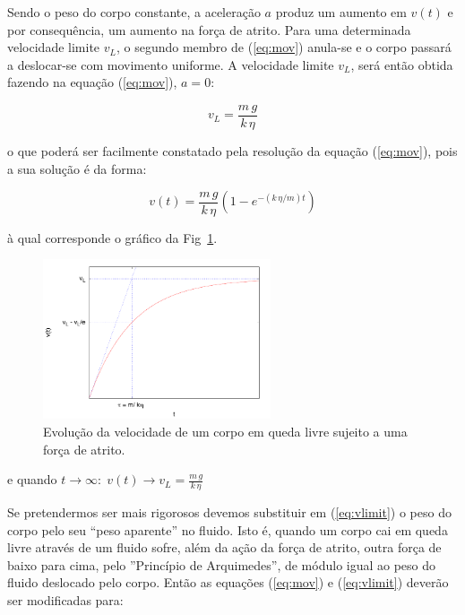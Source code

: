 \documentclass[a4paper,twoside,12pt]{article}      %
\begin{document}
Sendo o peso do corpo constante, a aceleração $a$ produz um aumento  em $v(t)$ e por consequência, um aumento na força de atrito. Para uma determinada velocidade limite $v_L$, o segundo membro de (\ref{eq:mov}) anula-se e o corpo passará a deslocar-se com movimento uniforme. A velocidade limite $v_L$, será então obtida fazendo na equação (\ref{eq:mov}), $a= 0$:

\begin{equation}
	\label{eq:vlimit}
	v_L = \frac{m\,g}{k  \, \eta}
\end{equation}

o que poderá ser facilmente constatado pela resolução da equação (\ref{eq:mov}), pois a sua solução é da forma:

\begin{equation}
	\label{eq:vlimita}
	v(t) = \frac{m\,g}{k  \, \eta} (1 - e^{- (k\,\eta / m) t})
\end{equation}

à qual corresponde o gráfico  da Fig~\ref{fig:vLim}.


\begin{figure}[tb]
  \centering 
	\includegraphics[width=0.6\textwidth]{./plote}
	\caption{ Evolução da velocidade de um corpo em queda livre sujeito a uma força de atrito. \label{fig:vLim}} 
\end{figure}


e quando $t \to \infty :\; v(t) \to v_L = \frac{m\,g}{k  \, \eta} $

Se pretendermos ser mais rigorosos devemos substituir  em (\ref{eq:vlimit}) o peso do corpo pelo seu “peso aparente” no fluido. Isto é, quando um corpo cai em queda livre através de um fluido sofre, além da ação da força de atrito, outra força de baixo para cima, pelo ''Princípio de Arquimedes'', de módulo igual ao peso do fluido deslocado pelo corpo. Então  as equações (\ref{eq:mov}) e (\ref{eq:vlimit}) deverão ser modificadas para:
\end{document}
